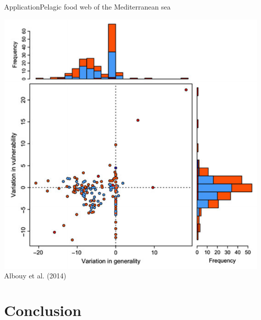 \documentclass{eecslides}
\begin{document}
	\begin{frame}{Application}{Pelagic food web of the Mediterranean sea}	  
		\begin{center}
			\includegraphics[height=0.6\textheight]{Albouy2014}\\
			\footnotesize{Albouy et al. (2014)}
		\end{center}
	\end{frame}
	
	\section{Conclusion}
\end{document}
